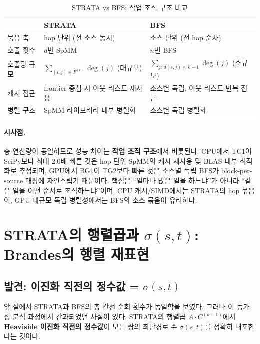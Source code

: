\documentclass[11pt,a4paper]{article}
\begin{document}
\begin{table}[H]\centering
\caption{STRATA vs BFS: 작업 조직 구조 비교}
\label{tab:org}
\small
\begin{tabular}{@{}lll@{}}
\toprule
& \textbf{STRATA} & \textbf{BFS} \\
\midrule
묶음 축 & hop 단위 (전 소스 동시) & 소스 단위 (전 hop 순차) \\
호출 횟수 & $d$번 SpMM & $n$번 BFS \\
호출당 규모 & $\sum_{(i,j) \in F^{(t)}} \deg(j)$ (대규모) & $\sum_{j:\,d(s,j) \leq k-1} \deg(j)$ (소규모) \\
캐시 접근 & frontier 중첩 시 이웃 리스트 재사용 & 소스별 독립, 이웃 리스트 반복 접근 \\
병렬 구조 & SpMM 라이브러리 내부 병렬화 & 소스별 독립 병렬화 \\
\bottomrule
\end{tabular}
\end{table}

\paragraph{시사점.}
총 연산량이 동일하므로 성능 차이는 \textbf{작업 조직 구조}에서 비롯된다. CPU에서 TC1이 SciPy보다 최대 2.0배 빠른 것은 hop 단위 SpMM의 캐시 재사용 및 BLAS 내부 최적화로 추정되며, GPU에서 BG1이 TG2보다 빠른 것은 소스별 독립 BFS가 block-per-source 매핑에 자연스럽기 때문이다. 핵심은 ``얼마나 많은 일을 하느냐''가 아니라 ``같은 일을 어떤 순서로 조직하느냐''이며, CPU 캐시/SIMD에서는 STRATA의 hop 묶음이, GPU 대규모 독립 병렬성에서는 BFS의 소스 묶음이 유리하다.


\section{STRATA의 행렬곱과 $\sigma(s,t)$: Brandes의 행렬 재표현}

\subsection{발견: 이진화 직전의 정수값 = $\sigma(s,t)$}

앞 절에서 STRATA과 BFS의 총 간선 순회 횟수가 동일함을 보였다. 그러나 이 등가성 분석 과정에서 간과되었던 사실이 있다. STRATA의 행렬곱 $A \cdot C^{(k-1)}$에서 \textbf{Heaviside 이진화 직전의 정수값}이 모든 쌍의 최단경로 수 $\sigma(s,t)$를 정확히 내포한다는 것이다.
\end{document}
